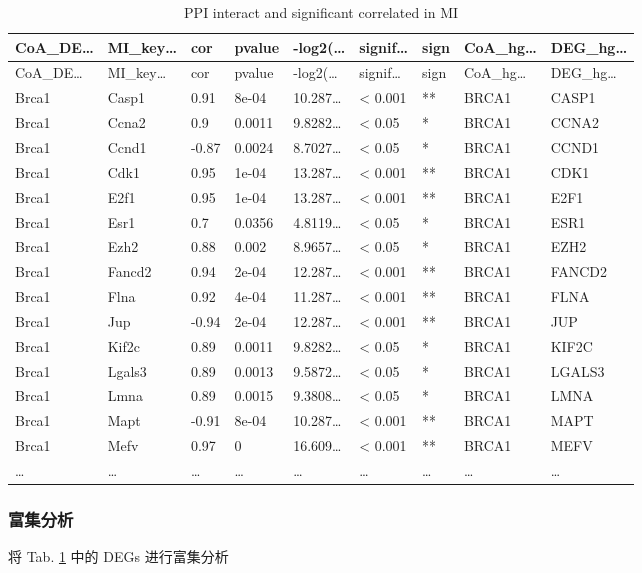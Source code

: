 \documentclass[
]{article}
\begin{document}
\begin{longtable}[]{@{}lllllllll@{}}
\caption{\label{tab:PPI-interact-and-significant-correlated-in-MI}PPI interact and significant correlated in MI}\tabularnewline
\toprule
CoA\_DE\ldots{} & MI\_key\ldots{} & cor & pvalue & -log2(\ldots{} & signif\ldots{} & sign & CoA\_hg\ldots{} & DEG\_hg\ldots{}\tabularnewline
\midrule
\endfirsthead
\toprule
CoA\_DE\ldots{} & MI\_key\ldots{} & cor & pvalue & -log2(\ldots{} & signif\ldots{} & sign & CoA\_hg\ldots{} & DEG\_hg\ldots{}\tabularnewline
\midrule
\endhead
Brca1 & Casp1 & 0.91 & 8e-04 & 10.287\ldots{} & \textless{} 0.001 & ** & BRCA1 & CASP1\tabularnewline
Brca1 & Ccna2 & 0.9 & 0.0011 & 9.8282\ldots{} & \textless{} 0.05 & * & BRCA1 & CCNA2\tabularnewline
Brca1 & Ccnd1 & -0.87 & 0.0024 & 8.7027\ldots{} & \textless{} 0.05 & * & BRCA1 & CCND1\tabularnewline
Brca1 & Cdk1 & 0.95 & 1e-04 & 13.287\ldots{} & \textless{} 0.001 & ** & BRCA1 & CDK1\tabularnewline
Brca1 & E2f1 & 0.95 & 1e-04 & 13.287\ldots{} & \textless{} 0.001 & ** & BRCA1 & E2F1\tabularnewline
Brca1 & Esr1 & 0.7 & 0.0356 & 4.8119\ldots{} & \textless{} 0.05 & * & BRCA1 & ESR1\tabularnewline
Brca1 & Ezh2 & 0.88 & 0.002 & 8.9657\ldots{} & \textless{} 0.05 & * & BRCA1 & EZH2\tabularnewline
Brca1 & Fancd2 & 0.94 & 2e-04 & 12.287\ldots{} & \textless{} 0.001 & ** & BRCA1 & FANCD2\tabularnewline
Brca1 & Flna & 0.92 & 4e-04 & 11.287\ldots{} & \textless{} 0.001 & ** & BRCA1 & FLNA\tabularnewline
Brca1 & Jup & -0.94 & 2e-04 & 12.287\ldots{} & \textless{} 0.001 & ** & BRCA1 & JUP\tabularnewline
Brca1 & Kif2c & 0.89 & 0.0011 & 9.8282\ldots{} & \textless{} 0.05 & * & BRCA1 & KIF2C\tabularnewline
Brca1 & Lgals3 & 0.89 & 0.0013 & 9.5872\ldots{} & \textless{} 0.05 & * & BRCA1 & LGALS3\tabularnewline
Brca1 & Lmna & 0.89 & 0.0015 & 9.3808\ldots{} & \textless{} 0.05 & * & BRCA1 & LMNA\tabularnewline
Brca1 & Mapt & -0.91 & 8e-04 & 10.287\ldots{} & \textless{} 0.001 & ** & BRCA1 & MAPT\tabularnewline
Brca1 & Mefv & 0.97 & 0 & 16.609\ldots{} & \textless{} 0.001 & ** & BRCA1 & MEFV\tabularnewline
\ldots{} & \ldots{} & \ldots{} & \ldots{} & \ldots{} & \ldots{} & \ldots{} & \ldots{} & \ldots{}\tabularnewline
\bottomrule
\end{longtable}

\hypertarget{ux5bccux96c6ux5206ux6790}{%
\subsubsection{富集分析}\label{ux5bccux96c6ux5206ux6790}}

将 Tab. \ref{tab:PPI-interact-and-significant-correlated-in-MI} 中的 DEGs 进行富集分析
\end{document}
